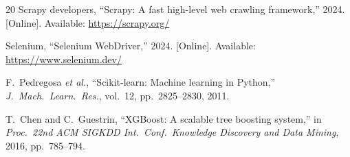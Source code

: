 \documentclass[lettersize,journal]{IEEEtran}
\begin{document}
\begin{thebibliography}{20}
Scrapy developers, ``Scrapy: A fast high-level web crawling framework,''
2024. [Online]. Available: \url{https://scrapy.org/}

Selenium, ``Selenium WebDriver,'' 2024. [Online]. Available:
\url{https://www.selenium.dev/}

F.~Pedregosa \textit{et al.}, ``Scikit-learn: Machine learning in Python,''
\textit{J.\ Mach.\ Learn.\ Res.}, vol.~12, pp.~2825--2830, 2011.

T.~Chen and C.~Guestrin, ``XGBoost: A scalable tree boosting system,'' in
\textit{Proc.\ 22nd ACM SIGKDD Int.\ Conf.\ Knowledge Discovery and Data
Mining}, 2016, pp.~785--794.

\end{thebibliography}
\end{document}
